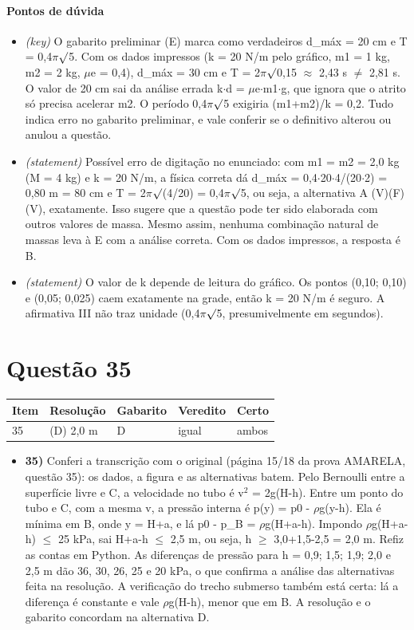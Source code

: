 \documentclass{article}%
\begin{document}
\paragraph{Pontos de dúvida}%
\begin{itemize}%
\item%
\textit{(key)} O gabarito preliminar (E) marca como verdadeiros d\_máx = 20 cm e T = 0,4$\pi$$\surd$5. Com os dados impressos (k = 20 N/m pelo gráfico, m1 = 1 kg, m2 = 2 kg, $\mu$e = 0,4), d\_máx = 30 cm e T = 2$\pi$$\surd$0,15 $\approx$ 2,43 s $\neq$ 2,81 s. O valor de 20 cm sai da análise errada k$\cdot$d = $\mu$e$\cdot$m1$\cdot$g, que ignora que o atrito só precisa acelerar m2. O período 0,4$\pi$$\surd$5 exigiria (m1+m2)/k = 0,2. Tudo indica erro no gabarito preliminar, e vale conferir se o definitivo alterou ou anulou a questão.%
\item%
\textit{(statement)} Possível erro de digitação no enunciado: com m1 = m2 = 2,0 kg (M = 4 kg) e k = 20 N/m, a física correta dá d\_máx = 0,4$\cdot$20$\cdot$4/(20$\cdot$2) = 0,80 m = 80 cm e T = 2$\pi$$\surd$(4/20) = 0,4$\pi$$\surd$5, ou seja, a alternativa A (V)(F)(V), exatamente. Isso sugere que a questão pode ter sido elaborada com outros valores de massa. Mesmo assim, nenhuma combinação natural de massas leva à E com a análise correta. Com os dados impressos, a resposta é B.%
\item%
\textit{(statement)} O valor de k depende de leitura do gráfico. Os pontos (0,10; 0,10) e (0,05; 0,025) caem exatamente na grade, então k = 20 N/m é seguro. A afirmativa III não traz unidade (0,4$\pi$$\surd$5, presumivelmente em segundos).%
\end{itemize}%
\section*{Questão 35}%
\begin{longtable}{@{}p{} p{} p{} p{} p{}@{}}\toprule Item & Resolução & Gabarito & Veredito & Certo \\ \midrule
35 & (D) 2,0 m & D & igual & ambos \\
\bottomrule\end{longtable}%
\begin{itemize}%
\item%
\textbf{35)} Conferi a transcrição com o original (página 15/18 da prova AMARELA, questão 35): os dados, a figura e as alternativas batem. Pelo Bernoulli entre a superfície livre e C, a velocidade no tubo é v$^2$ = 2g(H-h). Entre um ponto do tubo e C, com a mesma v, a pressão interna é p(y) = p0 - $\rho$g(y-h). Ela é mínima em B, onde y = H+a, e lá p0 - p\_B = $\rho$g(H+a-h). Impondo $\rho$g(H+a-h) $\leq$ 25 kPa, sai H+a-h $\leq$ 2,5 m, ou seja, h $\geq$ 3,0+1,5-2,5 = 2,0 m. Refiz as contas em Python. As diferenças de pressão para h = 0,9; 1,5; 1,9; 2,0 e 2,5 m dão 36, 30, 26, 25 e 20 kPa, o que confirma a análise das alternativas feita na resolução. A verificação do trecho submerso também está certa: lá a diferença é constante e vale $\rho$g(H-h), menor que em B. A resolução e o gabarito concordam na alternativa D.%
\end{itemize}%
\end{document}
